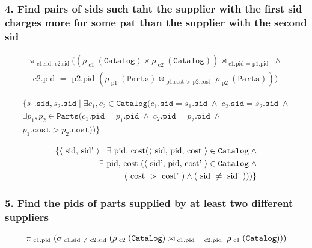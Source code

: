 \subsubsection{4. Find pairs of sids such taht the supplier with the first sid charges more for some pat than the supplier with the second sid}

\begin{align*}
  \pi_{\text{ c1.sid, c2.sid }}((\rho_{\text{ c1 }}(\mathtt{Catalog}) \times \rho_{\text{ c2 }}(\mathtt{Catalog})) \bowtie_{\text{ c1.pid } = \text{ p1.pid }} \wedge \\ 
  \text{ c2.pid } = \text{ p2.pid }(\rho_{\text{ p1 }}(\mathtt{Parts}) \bowtie_{\text{ p1.cost } > \text{ p2.cost }} \rho_{\text{ p2 }}(\mathtt{Parts})))
\end{align*}

\begin{align*}
  \{s_1.\mathtt{sid}, s_2.\mathtt{sid} \; | \; \exists c_1, c_2 \in \mathtt{Catalog}
  (c_1.\mathtt{sid} = s_1.\mathtt{sid} \; \wedge \; c_2.\mathtt{sid} = s_2.\mathtt{sid} \; \wedge \\
  \exists p_1, p_2 \in \mathtt{Parts} (c_1.\mathtt{pid} = p_1.\mathtt{pid} \; \wedge \; c_2.\mathtt{pid} = p_2.\mathtt{pid} \; \wedge \\
  p_1.\mathtt{cost} > p_2.\mathtt{cost}))\}
\end{align*}

\begin{align*}
  \{\langle \text{ sid, sid' } \rangle 
    \mid \exists \text{ pid, cost} (\langle \text{ sid, pid, cost } \rangle \in \mathtt{Catalog} \; \wedge \\
    \exists \text{ pid, cost } (\langle \text{ sid', pid, cost' } \rangle \in \mathtt{Catalog} \; \wedge \\
  (\text{ cost } > \text{ cost' }) \wedge (\text{ sid } \neq \text{ sid' })))\}
\end{align*}

\subsubsection{5. Find the pids of parts supplied by at least two different suppliers}

\begin{align*}
  \pi_{\text{ c1.pid }}(\sigma_{\text{ c1.sid }\neq\text{ c2.sid }}(\rho_{\text{ c2 }}(\mathtt{Catalog}) \bowtie_{\text{ c1.pid } = \text{ c2.pid }} \rho_{\text{ c1 }}(\mathtt{Catalog})))
\end{align*}

